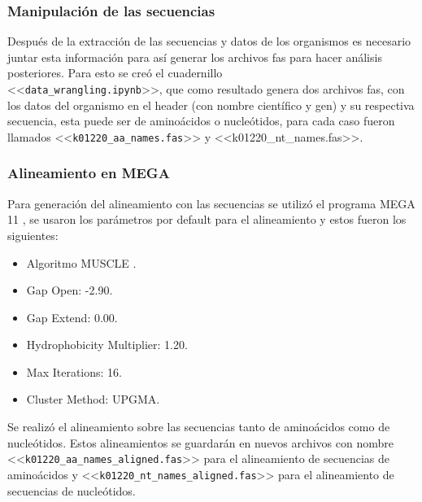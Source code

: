 \subsubsection{Manipulación de las secuencias}
Después de la extracción de las secuencias y datos de los organismos es necesario juntar esta  información para así generar los archivos fas para hacer análisis posteriores. Para esto se creó el cuadernillo \\<<\texttt{data\_wrangling.ipynb}>>, que como resultado genera dos archivos fas, con los datos del organismo en el header (con nombre científico y gen) y su respectiva secuencia, esta puede ser de aminoácidos o nucleótidos, para cada caso fueron llamados <<\texttt{k01220\_aa\_names.fas}>> y <<k01220\_nt\_names.fas>>. 

\subsubsection{Alineamiento en MEGA}
Para generación del alineamiento con las secuencias se utilizó el programa MEGA 11 \parencite{Tamura_2021}, se usaron los parámetros por default para el alineamiento y estos fueron los siguientes:
\begin{itemize}
	\item Algoritmo MUSCLE \parencite{Edgar_2004}.
	\item Gap Open: -2.90.  
	\item Gap Extend: 0.00.
	\item Hydrophobicity Multiplier: 1.20.
	\item Max Iterations: 16.
	\item Cluster Method: UPGMA.
\end{itemize}
 Se realizó el alineamiento sobre las secuencias tanto de aminoácidos como de nucleótidos. Estos alineamientos se guardarán en nuevos archivos con nombre <<\texttt{k01220\_aa\_names\_aligned.fas}>> para el alineamiento de secuencias de aminoácidos y <<\texttt{k01220\_nt\_names\_aligned.fas}>> para el alineamiento de secuencias de nucleótidos.


